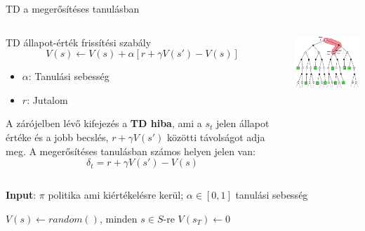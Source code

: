 \documentclass[english, aspectratio=169]{beamer}
\begin{document}
\begin{frame}{TD a megerősítéses tanulásban}
\begin{columns}
\begin{column}{.55\textwidth}
\begin{block}{TD állapot-érték frissítési szabály}
\[
V(s) \leftarrow V(s) + \alpha \left[ r + \gamma V(s') - V(s) \right]
\]
\vspace{-0.5cm}
\begin{itemize}
	\item $\alpha$: Tanulási sebesség
	\item $r$: Jutalom
\end{itemize}
\end{block}
A zárójelben lévő kifejezés a \textbf{TD hiba}, ami a $s_t$ jelen állapot értéke és a jobb becslés, $r + \gamma V(s')$ közötti távolságot adja meg. A megerősítéses tanulásban számos helyen jelen van: 
\[
\delta_t=r + \gamma V(s') - V(s)
\]
\end{column}
\begin{column}{.5\textwidth}
\begin{center}
\includegraphics[width=7cm, keepaspectratio]{images/mc_td_8.png}
\end{center}
\end{column}
\end{columns}
\end{frame}

\begin{frame}{}
\begin{algorithm}[H]
\caption{TD algoritmus $v_\pi$ megbecslésére}
\SetAlgoLined
\textbf{Input}: $\pi$ politika ami kiértékelésre kerül; $\alpha \in [0,1]$ tanulási sebesség\par\smallskip
$V(s) \leftarrow random()$, minden $s \in S$-re
$V(s_T) \leftarrow 0$
\end{algorithm}
\end{frame}
\end{document}
